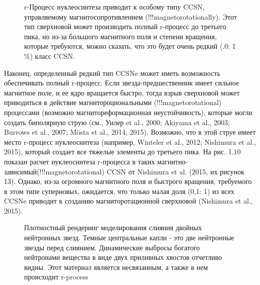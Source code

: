 \documentclass[%
bachelor,    %
natbib,      %
subf,        %
href,        %
colorlinks,  %
]{disser}
\begin{document}
\begin{figure}[h]
	\caption{r-Процесс нуклеосинтеза приводит к особому типу CCSN, управляемому магнитосопротивлением (!!!magnetorotationally). Этот тип сверхновой может производить полный r-процесс до третьего пика, но из-за большого магнитного поля и степени вращения, которые требуются,  можно сказать, что это будет очень редкий (.0: 1$\%$) класс CCSN.}
	\label{ris:10}
\end{figure}

Наконец, определенный редкий тип CCSNe может иметь возможность обеспечивать полный r-процесс. Если звезда-предшественник имеет сильное магнитное поле, и ее ядро вращается быстро, тогда взрыв сверхновой может приводиться в действие магнитороциональными (!!!magnetorotational) процессами (возможно магнитореформационная неустойчивость), которые могли создать биполярную струю (см., Уилер et al., 2000; Akiyama et al., 2003; Burrows et al., 2007; Mösta et al., 2014, 2015). Возможно, что в этой струе имеет место r-процесс нуклеосинтеза (например, Winteler et al., 2012; Nishimura et al., 2015), который создает все тяжелые элементы до третьего пика. На рис. 1.10 показан расчет нуклеосинтеза r-процесса в таких магнитно-зависимый(!!!magnetorotational) CCSN от Nishimura et al. (2015, их рисунок 13). Однако, из-за огромного магнитного поля и быстрого вращения, требуемого в этом типе суперновых, ожидается, что только малая доля (0,1: 1) из всех CCSNe приводит к созданию магниторотационной сверхновой (Nishimura et al., 2015).

\begin{figure}[h]
	\caption{Плотностный рендеринг моделирования слияния двойных нейтронных звезд. Темные центральные капли - это две нейтронные звезды перед слиянием. Динамические выбросы богатого нейтронами вещества в виде двух приливных хвостов отчетливо видны. Этот материал является несвязанным, а также в нем происходит r-process}
	\label{ris:11}
\end{figure}
\end{document}
